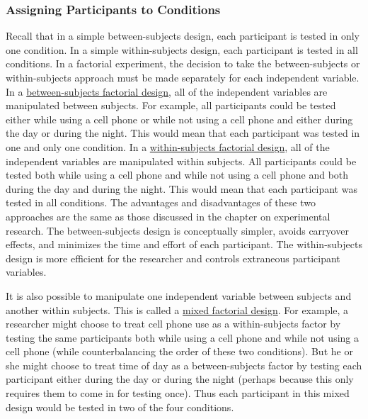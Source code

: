 \documentclass[
]{krantz}
\begin{document}
\hypertarget{assigning-participants-to-conditions}{%
\subsubsection*{Assigning Participants to Conditions}\label{assigning-participants-to-conditions}}


Recall that in a simple between-subjects design, each participant is tested in only one condition. In a simple within-subjects design, each participant is tested in all conditions. In a factorial experiment, the decision to take the between-subjects or within-subjects approach must be made separately for each independent variable. In a \protect\hyperlink{between-subjects-factorial-design}{between-subjects factorial design}, all of the independent variables are manipulated between subjects. For example, all participants could be tested either while using a cell phone or while not using a cell phone and either during the day or during the night. This would mean that each participant was tested in one and only one condition. In a \protect\hyperlink{within-subjects-factorial-design}{within-subjects factorial design}, all of the independent variables are manipulated within subjects. All participants could be tested both while using a cell phone and while not using a cell phone and both during the day and during the night. This would mean that each participant was tested in all conditions. The advantages and disadvantages of these two approaches are the same as those discussed in the chapter on experimental research. The between-subjects design is conceptually simpler, avoids carryover effects, and minimizes the time and effort of each participant. The within-subjects design is more efficient for the researcher and controls extraneous participant variables.

It is also possible to manipulate one independent variable between subjects and another within subjects. This is called a \protect\hyperlink{mixed-factorial-design}{mixed factorial design}. For example, a researcher might choose to treat cell phone use as a within-subjects factor by testing the same participants both while using a cell phone and while not using a cell phone (while counterbalancing the order of these two conditions). But he or she might choose to treat time of day as a between-subjects factor by testing each participant either during the day or during the night (perhaps because this only requires them to come in for testing once). Thus each participant in this mixed design would be tested in two of the four conditions.
\end{document}
